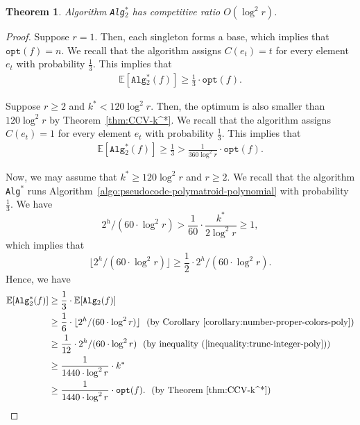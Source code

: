 \documentclass[11pt]{article}
\newtheorem{theorem}{Theorem}
\theoremstyle{definition}
\newcommand{\opt}{\texttt{opt}}
\begin{document}
\begin{theorem}\label{theorem:approximation-poly}
    Algorithm \texttt{Alg$_2^*$} has competitive ratio $O(\log^2 r)$.
\end{theorem}
\begin{proof}
    Suppose $r=1$. Then, each singleton forms a base, which implies that $\opt(f)=n$. We recall that the algorithm assigns $C(e_t)=t$ for every element $e_t$ with probability $\frac{1}{3}$. This implies that
    $$\begin{aligned}
        \mathbb{E}[\texttt{Alg$_2^*$}(f)] \geq \frac{1}{3}\cdot \opt(f).
    \end{aligned}$$

    Suppose $r\geq 2$ and $k^*< 120\log^2 r$. Then, the optimum is also smaller than $120\log^2 r$ by Theorem~\ref{thm:CCV-k^*}. We recall that the algorithm assigns $C(e_t)=1$ for every element $e_t$ with probability $\frac{1}{3}$. This implies that
    $$\begin{aligned}
        \mathbb{E}[\texttt{Alg$_2^*$}(f)] \geq \frac{1}{3} > \frac{1}{360\log^2 r}\cdot \opt(f).
    \end{aligned}$$

    Now, we may assume that $k^*\geq 120\log^2 r$ and $r\geq 2$. We recall that the algorithm \texttt{Alg$^*$} runs Algorithm~\ref{algo:pseudocode-polymatroid-polynomial} with probability $\frac{1}{3}$. We have
    $$2^h/ (60\cdot \log^2 r)> \frac{1}{60}\cdot \frac{k^*}{2\log^2 r}\geq 1,$$ which implies that
    \begin{equation}\label{inequality:trunc-integer-poly}
        \lfloor 2^h/ (60\cdot \log^2 r)\rfloor \geq \frac{1}{2}\cdot 2^h/ (60\cdot \log^2 r).
    \end{equation}
    Hence, we have
    $$\begin{aligned}
        \mathbb{E}[\texttt{Alg$_2^*$}(f)]&\geq \frac{1}{3}\cdot \mathbb{E}[\texttt{Alg$_2$}(f)] \\
        &\geq \frac{1}{6}\cdot \lfloor 2^h/ (60\cdot \log^2 r)\rfloor \ \ \text{(by Corollary~\ref{corollary:number-proper-colors-poly})}\\
        &\geq \frac{1}{12}\cdot 2^h/ (60\cdot \log^2 r) \ \ \text{(by inequality~(\ref{inequality:trunc-integer-poly}))}\\
        &\geq \frac{1}{1440\cdot \log^2r}\cdot k^* \\
        &\geq \frac{1}{1440\cdot \log^2r}\cdot \opt(f). \ \ \text{(by Theorem~\ref{thm:CCV-k^*})}
    \end{aligned}$$
\end{proof}
\end{document}
